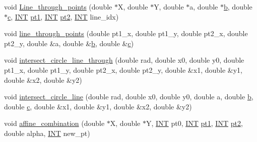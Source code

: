 \begin{DoxyCompactItemize}
\item 
void \mbox{\hyperlink{draw_8_c_ab75a4d12a81cf7069ae5f4d7e2c9b1b7}{Line\+\_\+through\+\_\+points}} (double $\ast$X, double $\ast$Y, double $\ast$a, double $\ast$\mbox{\hyperlink{alphabet2_8_c_a148e3876077787926724625411d6e7a9}{b}}, double $\ast$\mbox{\hyperlink{alphabet2_8_c_a4e1e0e72dd773439e333c84dd762a9c3}{c}}, \mbox{\hyperlink{galois_8h_a09fddde158a3a20bd2dcadb609de11dc}{I\+NT}} \mbox{\hyperlink{clique__finder_8_c_ae170b0dc139c709e902c286671b94cba}{pt1}}, \mbox{\hyperlink{galois_8h_a09fddde158a3a20bd2dcadb609de11dc}{I\+NT}} \mbox{\hyperlink{clique__finder_8_c_a94324c2f74f64c974008fbc2faeda805}{pt2}}, \mbox{\hyperlink{galois_8h_a09fddde158a3a20bd2dcadb609de11dc}{I\+NT}} line\+\_\+idx)
\item 
void \mbox{\hyperlink{draw_8_c_a5ee4019c0d4a044589e3789747e09ab1}{line\+\_\+through\+\_\+points}} (double pt1\+\_\+x, double pt1\+\_\+y, double pt2\+\_\+x, double pt2\+\_\+y, double \&a, double \&\mbox{\hyperlink{alphabet2_8_c_a148e3876077787926724625411d6e7a9}{b}}, double \&\mbox{\hyperlink{alphabet2_8_c_a4e1e0e72dd773439e333c84dd762a9c3}{c}})
\item 
void \mbox{\hyperlink{draw_8_c_aff0422122d76e944bc98278016b3a549}{intersect\+\_\+circle\+\_\+line\+\_\+through}} (double rad, double x0, double y0, double pt1\+\_\+x, double pt1\+\_\+y, double pt2\+\_\+x, double pt2\+\_\+y, double \&x1, double \&y1, double \&x2, double \&y2)
\item 
void \mbox{\hyperlink{draw_8_c_a0eed3efc2da12c0a55277c0979e24f36}{intersect\+\_\+circle\+\_\+line}} (double rad, double x0, double y0, double a, double \mbox{\hyperlink{alphabet2_8_c_a148e3876077787926724625411d6e7a9}{b}}, double \mbox{\hyperlink{alphabet2_8_c_a4e1e0e72dd773439e333c84dd762a9c3}{c}}, double \&x1, double \&y1, double \&x2, double \&y2)
\item 
void \mbox{\hyperlink{draw_8_c_a0cc73ffebbfe7a9cc073b005a1e9dedd}{affine\+\_\+combination}} (double $\ast$X, double $\ast$Y, \mbox{\hyperlink{galois_8h_a09fddde158a3a20bd2dcadb609de11dc}{I\+NT}} pt0, \mbox{\hyperlink{galois_8h_a09fddde158a3a20bd2dcadb609de11dc}{I\+NT}} \mbox{\hyperlink{clique__finder_8_c_ae170b0dc139c709e902c286671b94cba}{pt1}}, \mbox{\hyperlink{galois_8h_a09fddde158a3a20bd2dcadb609de11dc}{I\+NT}} \mbox{\hyperlink{clique__finder_8_c_a94324c2f74f64c974008fbc2faeda805}{pt2}}, double alpha, \mbox{\hyperlink{galois_8h_a09fddde158a3a20bd2dcadb609de11dc}{I\+NT}} new\+\_\+pt)
\item 

\end{DoxyCompactItemize}
